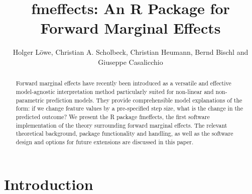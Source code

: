 \title{fmeffects: An R Package for Forward Marginal Effects}
\author{Holger Löwe\footnotemark[1], Christian A. Scholbeck\footnotemark[1], Christian Heumann, Bernd Bischl and Giuseppe Casalicchio}

\maketitle

\begin{abstract}

Forward marginal effects have recently been introduced as a versatile and effective model-agnostic interpretation method particularly suited for non-linear and non-parametric prediction models. They provide comprehensible model explanations of the form: if we change feature values by a pre-specified step size, what is the change in the predicted outcome? We present the R package fmeffects, the first software implementation of the theory surrounding forward marginal effects. The relevant theoretical background, package functionality and handling, as well as the software design and options for future extensions are discussed in this paper.
\end{abstract}

\section{Introduction}

